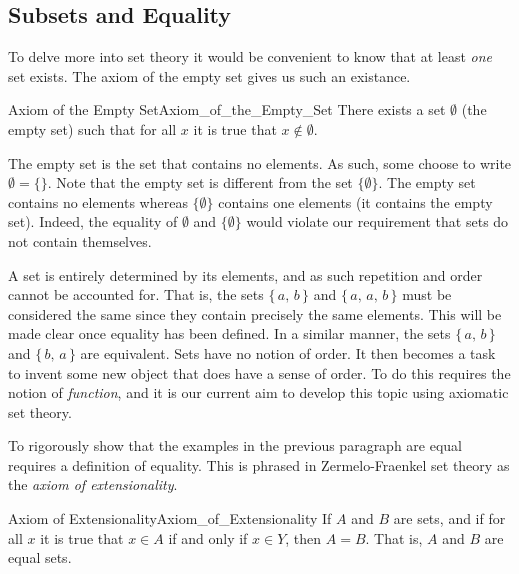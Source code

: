     \subsection{Subsets and Equality}
        To delve more into set theory it would be convenient to know that at
        least \textit{one} set exists. The axiom of the empty set gives us such
        an existance.
        \begin{faxiom}{Axiom of the Empty Set}{Axiom_of_the_Empty_Set}
            There exists a set $\emptyset$ (the \gls{empty set}) such that for
            all $x$ it is true that $x\notin\emptyset$.
        \end{faxiom}
        The empty set is the set that contains no elements. As such, some choose
        to write $\emptyset=\{\}$. Note that the empty set is different from the
        set $\{\emptyset\}$. The empty set contains no elements whereas
        $\{\emptyset\}$ contains one elements (it contains the empty set).
        Indeed, the equality of $\emptyset$ and $\{\emptyset\}$ would violate
        our requirement that sets do not contain themselves.
        \par\hfill\par
        A set is entirely determined by its elements, and as such repetition and
        order cannot be accounted for. That is, the sets $\{\,a,\,b\,\}$ and
        $\{\,a,\,a,\,b\,\}$ must be considered the same since they contain
        precisely the same elements. This will be made clear once equality has
        been defined. In a similar manner, the sets $\{\,a,\,b\,\}$ and
        $\{\,b,\,a\,\}$ are equivalent. Sets have no notion of order. It then
        becomes a task to invent some new object that does have a sense of
        order. To do this requires the notion of \textit{function}, and it is
        our current aim to develop this topic using axiomatic set theory.
        \par\hfill\par
        To rigorously show that the examples in the previous paragraph are equal
        requires a definition of equality. This is phrased in Zermelo-Fraenkel
        set theory as the \textit{axiom of extensionality}.
        \begin{faxiom}{Axiom of Extensionality}{Axiom_of_Extensionality}
            If $A$ and $B$ are sets, and if for all $x$ it is true that
            $x\in{A}$ if and only if $x\in{Y}$, then $A=B$. That is, $A$ and $B$
            are equal sets.
        \end{faxiom}
